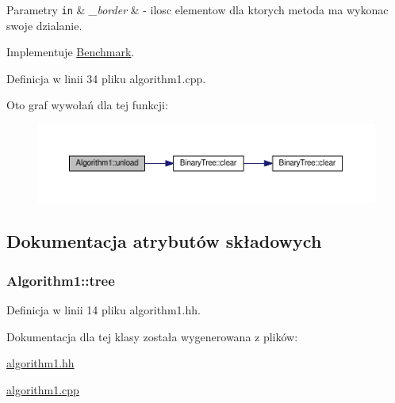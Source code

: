 \begin{DoxyParams}[1]{Parametry}
\mbox{\tt in}  & {\em \-\_\-border} & -\/ ilosc elementow dla ktorych metoda ma wykonac swoje dzialanie. \\
\hline
\end{DoxyParams}


Implementuje \hyperlink{class_benchmark_a2dcfb6ee9e648ae88d8c131b2b191bed}{Benchmark}.



Definicja w linii 34 pliku algorithm1.\-cpp.



Oto graf wywołań dla tej funkcji\-:
\nopagebreak
\begin{figure}[H]
\begin{center}
\leavevmode
\includegraphics[width=350pt]{class_algorithm1_a135dd26c6c741812d75cd7f2f270592d_cgraph}
\end{center}
\end{figure}




\subsection{Dokumentacja atrybutów składowych}
\hypertarget{class_algorithm1_ad499b054580dfc651ad70274bf5e71b8}{
\subsubsection[{tree}]{ Algorithm1\-::tree\hspace{0.3cm}{\ttfamily [private]}}}\label{class_algorithm1_ad499b054580dfc651ad70274bf5e71b8}


Definicja w linii 14 pliku algorithm1.\-hh.



Dokumentacja dla tej klasy została wygenerowana z plików\-:\begin{DoxyCompactItemize}
\item 
\hyperlink{algorithm1_8hh}{algorithm1.\-hh}\item 
\hyperlink{algorithm1_8cpp}{algorithm1.\-cpp}\end{DoxyCompactItemize}
